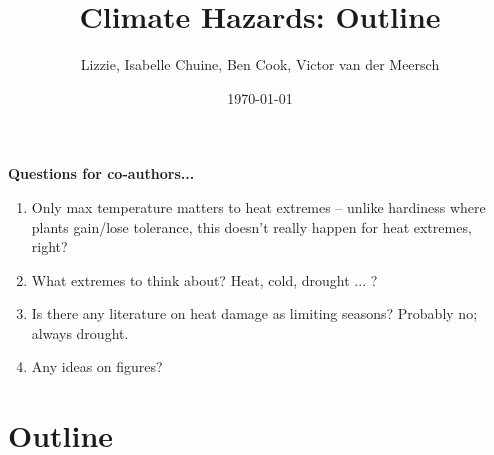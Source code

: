 \documentclass[11pt,letter]{article}
\begin{document}

\renewcommand{\refname}{\CHead{}}

\title{Climate Hazards: Outline} %
\author{Lizzie, Isabelle Chuine, Ben Cook, Victor van der Meersch} %
\date{\today}
\maketitle

{\bf Questions for co-authors...}
\begin{enumerate}
\item Only max temperature matters to heat extremes -- unlike hardiness where plants gain/lose tolerance, this doesn't really happen for heat extremes, right?
\item What extremes to think about? Heat, cold, drought ... ?
\item Is there any literature on heat damage as limiting seasons? Probably no; always drought. 
\item Any ideas on figures?
\end{enumerate}

\section{Outline}
\end{document}
